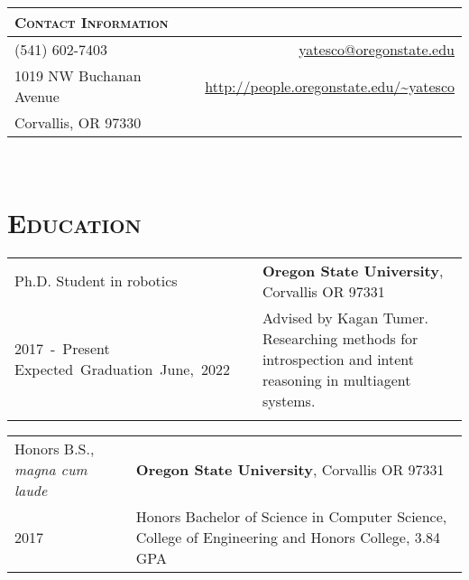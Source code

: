 \documentclass[letterpaper,10pt,titlepage]{article}
\newcommand{\leftW}{0.28\textwidth}
\begin{document}
\pagestyle{empty}%
\par{\bigskip\par}%

\begin{tabularx}{\linewidth}{Xr}%
\textsc{Contact Information} & \\\hline
(541) 602-7403 & \url{yatesco@oregonstate.edu}\\
1019 NW Buchanan Avenue & \url{http://people.oregonstate.edu/\~yatesco}\\
	Corvallis, OR 97330 & \\
\end{tabularx}%
\\%


\section*{\textsc{Education}}
\begin{tabularx}{\textwidth}{p{\leftW}X}
	Ph.D. Student in robotics & \textbf{Oregon State University}, Corvallis OR 97331\\

	\mbox{2017 - Present} \mbox{Expected Graduation June, 2022}& Advised by Kagan Tumer. Researching methods for introspection and intent reasoning in multiagent systems.\\
	 &\\
\end{tabularx}
\begin{tabularx}{\textwidth}{p{\leftW}X}
	Honors B.S., \textit{magna cum laude} & \textbf{Oregon State University}, Corvallis OR 97331\\
	2017 & Honors Bachelor of Science in Computer Science, College of Engineering and Honors College, 3.84 GPA \\
\end{tabularx}
\end{document}
